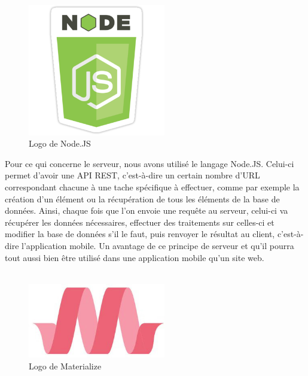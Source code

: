 \documentclass[pidr]{tnreport}
\begin{document}
\newpage
\begin{figure}
  \centering
  \includegraphics[width=6cm]{figures/node}
  \caption{Logo de Node.JS}
  \label{fig:logo-nodejs}
\end{figure}
Pour ce qui concerne le serveur, nous avons utilisé le langage Node.JS. Celui-ci permet d’avoir une API REST, c’est-à-dire un certain nombre d’URL correspondant chacune à une tache spécifique à effectuer, comme par exemple la création d’un élément ou la récupération de tous les éléments de la base de données. Ainsi, chaque fois que l’on envoie une requête au serveur, celui-ci va récupérer les données nécessaires, effectuer des traitements sur celles-ci et modifier la base de données s’il le faut, puis renvoyer le résultat au client, c’est-à-dire l’application mobile. Un avantage de ce principe de serveur et qu’il pourra tout aussi bien être utilisé dans une application mobile qu’un site web.
\\
\\
\begin{figure}
  \centering
  \includegraphics[width=6cm]{figures/materialize}
  \caption{Logo de Materialize}
  \label{fig:logo-materialize}
\end{figure}
\end{document}
